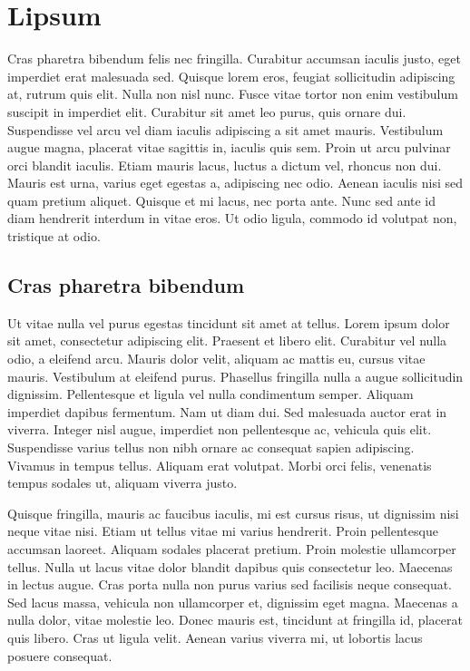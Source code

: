 \chapter{Lipsum}
\label{section:lipsum}

Cras pharetra bibendum felis nec fringilla. Curabitur accumsan iaculis justo, eget imperdiet erat malesuada sed. Quisque lorem eros, feugiat sollicitudin adipiscing at, rutrum quis elit. Nulla non nisl nunc. Fusce vitae tortor non enim vestibulum suscipit in imperdiet elit. Curabitur sit amet leo purus, quis ornare dui. Suspendisse vel arcu vel diam iaculis adipiscing a sit amet mauris. Vestibulum augue magna, placerat vitae sagittis in, iaculis quis sem. Proin ut arcu pulvinar orci blandit iaculis. Etiam mauris lacus, luctus a dictum vel, rhoncus non dui. Mauris est urna, varius eget egestas a, adipiscing nec odio. Aenean iaculis nisi sed quam pretium aliquet. Quisque et mi lacus, nec porta ante. Nunc sed ante id diam hendrerit interdum in vitae eros. Ut odio ligula, commodo id volutpat non, tristique at odio.

\section{Cras pharetra bibendum}
\label{section:lipsum:cras}

Ut vitae nulla vel purus egestas tincidunt sit amet at tellus. Lorem ipsum dolor sit amet, consectetur adipiscing elit. Praesent et libero elit. Curabitur vel nulla odio, a eleifend arcu. Mauris dolor velit, aliquam ac mattis eu, cursus vitae mauris. Vestibulum at eleifend purus. Phasellus fringilla nulla a augue sollicitudin dignissim. Pellentesque et ligula vel nulla condimentum semper. Aliquam imperdiet dapibus fermentum. Nam ut diam dui. Sed malesuada auctor erat in viverra. Integer nisl augue, imperdiet non pellentesque ac, vehicula quis elit. Suspendisse varius tellus non nibh ornare ac consequat sapien adipiscing. Vivamus in tempus tellus. Aliquam erat volutpat. Morbi orci felis, venenatis tempus sodales ut, aliquam viverra justo.~\cite{conference:06,Doe:2010}

Quisque fringilla, mauris ac faucibus iaculis, mi est cursus risus, ut dignissim nisi neque vitae nisi. Etiam ut tellus vitae mi varius hendrerit. Proin pellentesque accumsan laoreet. Aliquam sodales placerat pretium. Proin molestie ullamcorper tellus. Nulla ut lacus vitae dolor blandit dapibus quis consectetur leo. Maecenas in lectus augue. Cras porta nulla non purus varius sed facilisis neque consequat. Sed lacus massa, vehicula non ullamcorper et, dignissim eget magna. Maecenas a nulla dolor, vitae molestie leo. Donec mauris est, tincidunt at fringilla id, placerat quis libero. Cras ut ligula velit. Aenean varius viverra mi, ut lobortis lacus posuere consequat.

